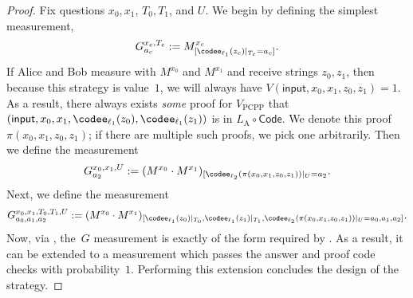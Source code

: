 \begin{proof}
Fix questions $x_0, x_1$, $T_0, T_1$, and $U$.  We begin by defining the simplest measurement,
\begin{equation}\label{eq:i-dont-know-what-to-call-this}
G^{x_c, T_c}_{a_c} := M^{x_c}_{[\codee_{\ell_1}(z_c)|_{T_c} = a_c]}.
\end{equation}
If Alice and Bob measure with $M^{x_0}$ and $M^{x_1}$ and receive strings $z_0, z_1$,
then because this strategy is value~$1$,
we will always have $V(\mathsf{input}, x_0, x_1, z_0, z_1) = 1$.
As a result, there always exists \emph{some} proof for $V_{\mathrm{PCPP}}$
that $(\mathsf{input}, x_0, x_1, \codee_{\ell_1}(z_0), \codee_{\ell_1}(z_1))$ is in $L_{\mathrm{A}} \circ \mathsf{Code}$.
We denote this proof $\pi(x_0, x_1, z_0, z_1)$; if there are multiple such proofs, we pick one arbitrarily.
Then we define the measurement
\begin{equation}\label{eq:i-dont-know-what-to-call-this-part-two-return-of-the-bat}
G^{x_0, x_1, U}_{a_2} := (M^{x_0} \cdot M^{x_1})_{[\codee_{\ell_2}(\pi(x_0, x_1, z_0, z_1))|_{U} = a_2}.
\end{equation}
Next, we define the measurement
\begin{equation*}
G^{x_0, x_1, T_0, T_1, U}_{a_0, a_1, a_2}
:= (M^{x_0}\cdot M^{x_1})_{[\codee_{\ell_1}(z_0)|_{T_0}, \codee_{\ell_1}(z_1)|_{T_1}, \codee_{\ell_2}(\pi(x_0, x_1, z_0, z_1))|_{U} = a_0, a_1, a_2]}.
\end{equation*}
Now, via ,
the~$G$ measurement is exactly of the form required by .
As a result, it can be extended to a measurement which passes the answer and proof code checks with probability~$1$.
Performing this extension concludes the design of the strategy.


\end{proof}
